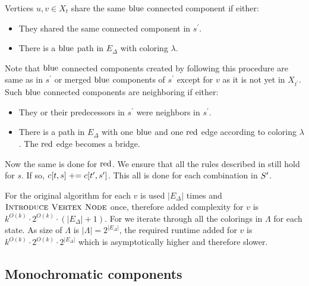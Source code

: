 Vertices \( u, v \in X_t \) share the same \( \text{blue} \) connected component if either:
%
\begin{itemize}
	\item They shared the same connected component in \( s^\prime \).
	\item There is a \( \text{blue} \) path in \( E_\Delta \) with coloring \( \lambda \).
\end{itemize}
%
Note that \( \text{blue} \) connected components created by following this procedure
are same as in \( s^\prime \) or merged \( \text{blue} \) components of \( s^\prime \)
except for \( v \) as it is not yet in \( X_{t^\prime} \).
Such \( \text{blue} \) connected components are neighboring if either:
%
\begin{itemize}
	\item They or their predecessors in \( s^\prime \)
	      were neighbors in \( s^\prime \).
	\item There is a path in \( E_\Delta \) with
	      one \( \text{blue} \) and one \( \text{red} \) edge
	      according to coloring \( \lambda \).
	      The \( \text{red} \) edge becomes a bridge.
\end{itemize}
%
Now the same is done for \( \text{red} \).
We ensure that all the rules described in \IntroduceEdgeNode{}
still hold for \( s \). If so, \( c[t, s] \mathrel{+}= c[t^\prime, s^\prime] \).
This all is done for each combination in \( S^\prime \time \Lambda \).

For the original algorithm for each \( v \)
\IntroduceEdgeNode{} is used \( |E_\Delta| \) times
and \( \textsc{Introduce Vertex Node}{} \) once, therefore added complexity for \( v \)
is \( {k}^{O(k)} \cdot 2^{O(k)} \cdot (|E_\Delta| + 1) \).
%
For \IntroduceVertexWithEdgesNode{} we iterate
through all the colorings in \( \Lambda \) for each state.
As size of \( \Lambda \) is \( |\Lambda| = 2^|E_\Delta| \),
the required runtime added for \( v \) is
\( {k}^{O(k)} \cdot 2^{O(k)} \cdot 2^{|E_\Delta|}\)
which is asymptotically higher and therefore slower.

\subsection{Monochromatic components}

